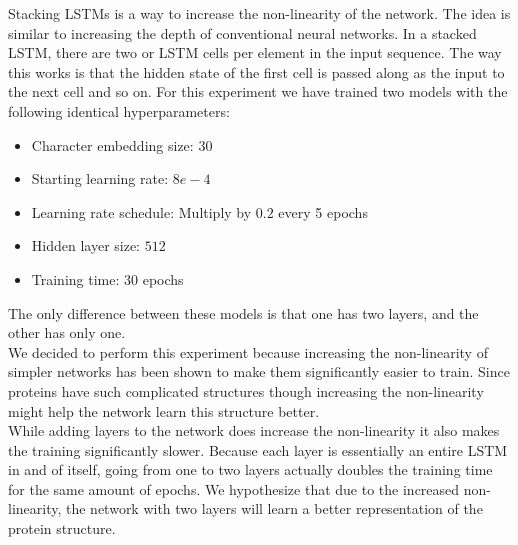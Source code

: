 Stacking LSTMs is a way to increase the non-linearity of the network. The idea is similar to increasing the depth of conventional neural networks. In a stacked LSTM, there are two or LSTM cells per element in the input sequence. The way this works is that the hidden state of the first cell is passed along as the input to the next cell and so on. For this experiment we have trained two models with the following identical hyperparameters:
\begin{itemize}
    \item Character embedding size: 30
    \item Starting learning rate: $8e-4$
    \item Learning rate schedule: Multiply by $0.2$ every 5 epochs
    \item Hidden layer size: $512$
    \item Training time: 30 epochs
\end{itemize}
The only difference between these models is that one has two layers, and the other has only one.\\

\noindent
We decided to perform this experiment because increasing the non-linearity of simpler networks has been shown to make them significantly easier to train. Since proteins have such complicated structures though increasing the non-linearity might help the network learn this structure better.\\

\noindent
While adding layers to the network does increase the non-linearity it also makes the training significantly slower. Because each layer is essentially an entire LSTM in and of itself, going from one to two layers actually doubles the training time for the same amount of epochs. We hypothesize that due to the increased non-linearity, the network with two layers will learn a better representation of the protein structure.